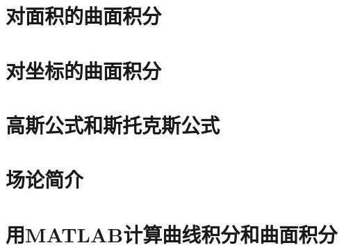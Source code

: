 \section{对面积的曲面积分}


\section{对坐标的曲面积分}


\section{高斯公式和斯托克斯公式}


\section{场论简介}


\section{用MATLAB计算曲线积分和曲面积分}